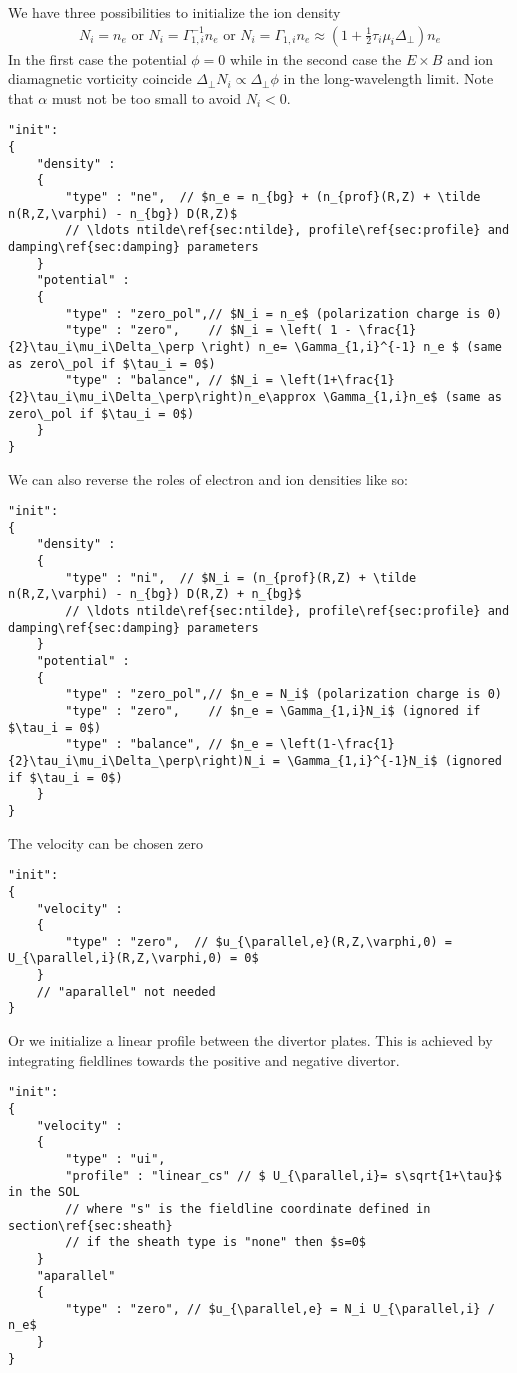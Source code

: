 We have three possibilities to initialize the ion density
\begin{align} \label{eq:initphi}
    N_i = n_e \text{ or }N_i = \Gamma_{1,i}^{-1} n_e \text{ or } N_i = \Gamma_{1,i}n_e\approx \left(1+\frac{1}{2}\tau_i\mu_i\Delta_\perp\right)n_e
\end{align}
In the first case the potential $\phi= 0$ while in the second case
the $E\times B$ and ion diamagnetic vorticity coincide $\Delta_\perp N_i \propto \Delta_\perp \phi$ in the long-wavelength limit.
Note that $\alpha$ must not be too small to avoid $N_i < 0$.
\begin{verbatim}
"init":
{
    "density" :
    {
        "type" : "ne",  // $n_e = n_{bg} + (n_{prof}(R,Z) + \tilde n(R,Z,\varphi) - n_{bg}) D(R,Z)$
        // \ldots ntilde\ref{sec:ntilde}, profile\ref{sec:profile} and damping\ref{sec:damping} parameters
    }
    "potential" :
    {
        "type" : "zero_pol",// $N_i = n_e$ (polarization charge is 0)
        "type" : "zero",    // $N_i = \left( 1 - \frac{1}{2}\tau_i\mu_i\Delta_\perp \right) n_e= \Gamma_{1,i}^{-1} n_e $ (same as zero\_pol if $\tau_i = 0$)
        "type" : "balance", // $N_i = \left(1+\frac{1}{2}\tau_i\mu_i\Delta_\perp\right)n_e\approx \Gamma_{1,i}n_e$ (same as zero\_pol if $\tau_i = 0$)
    }
}
\end{verbatim}
\noindent
We can also reverse the roles of electron and ion densities like so:
\begin{verbatim}
"init":
{
    "density" :
    {
        "type" : "ni",  // $N_i = (n_{prof}(R,Z) + \tilde n(R,Z,\varphi) - n_{bg}) D(R,Z) + n_{bg}$
        // \ldots ntilde\ref{sec:ntilde}, profile\ref{sec:profile} and damping\ref{sec:damping} parameters
    }
    "potential" :
    {
        "type" : "zero_pol",// $n_e = N_i$ (polarization charge is 0)
        "type" : "zero",    // $n_e = \Gamma_{1,i}N_i$ (ignored if $\tau_i = 0$)
        "type" : "balance", // $n_e = \left(1-\frac{1}{2}\tau_i\mu_i\Delta_\perp\right)N_i = \Gamma_{1,i}^{-1}N_i$ (ignored if $\tau_i = 0$)
    }
}
\end{verbatim}
\noindent
The velocity can be chosen zero
\begin{verbatim}
"init":
{
    "velocity" :
    {
        "type" : "zero",  // $u_{\parallel,e}(R,Z,\varphi,0) = U_{\parallel,i}(R,Z,\varphi,0) = 0$
    }
    // "aparallel" not needed
}
\end{verbatim}
\noindent
Or we initialize a linear profile between the divertor plates. This is achieved
by integrating fieldlines towards the positive and negative divertor.
\begin{verbatim}
"init":
{
    "velocity" :
    {
        "type" : "ui",
        "profile" : "linear_cs" // $ U_{\parallel,i}= s\sqrt{1+\tau}$ in the SOL
        // where "s" is the fieldline coordinate defined in section\ref{sec:sheath}
        // if the sheath type is "none" then $s=0$
    }
    "aparallel"
    {
        "type" : "zero", // $u_{\parallel,e} = N_i U_{\parallel,i} / n_e$
    }
}
\end{verbatim}
\noindent
